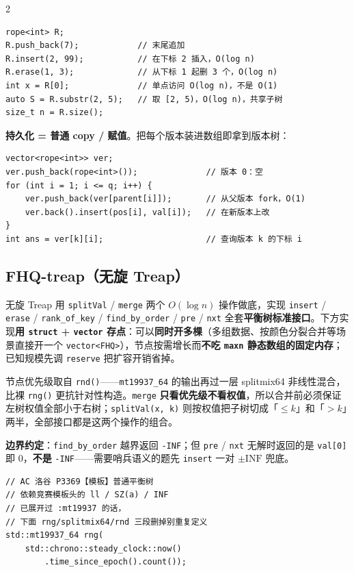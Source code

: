 \begin{multicols*}{2}
\begin{verbatim}
rope<int> R;
R.push_back(7);            // 末尾追加
R.insert(2, 99);           // 在下标 2 插入，O(log n)
R.erase(1, 3);             // 从下标 1 起删 3 个，O(log n)
int x = R[0];              // 单点访问 O(log n)，不是 O(1)
auto S = R.substr(2, 5);   // 取 [2, 5)，O(log n)，共享子树
size_t n = R.size();
	\end{verbatim}

	\textbf{持久化 = 普通 copy / 赋值}。把每个版本装进数组即拿到版本树：

	\begin{verbatim}
vector<rope<int>> ver;
ver.push_back(rope<int>());              // 版本 0：空
for (int i = 1; i <= q; i++) {
    ver.push_back(ver[parent[i]]);       // 从父版本 fork，O(1)
    ver.back().insert(pos[i], val[i]);   // 在新版本上改
}
int ans = ver[k][i];                     // 查询版本 k 的下标 i
	\end{verbatim}

	\subsection{FHQ-treap（无旋 Treap）}

	无旋 Treap 用 \verb|splitVal| / \verb|merge| 两个 $O(\log n)$ 操作做底，实现 \verb|insert| / \verb|erase| / \verb|rank_of_key| / \verb|find_by_order| / \verb|pre| / \verb|nxt| 全套\textbf{平衡树标准接口}。下方实现\textbf{用 \texttt{struct} + \texttt{vector} 存点}：可以\textbf{同时开多棵}（多组数据、按颜色分裂合并等场景直接开一个 \verb|vector<FHQ>|），节点按需增长而\textbf{不吃 \texttt{maxn} 静态数组的固定内存}；已知规模先调 \verb|reserve| 把扩容开销省掉。

	节点优先级取自 \verb|rnd()|——\verb|mt19937_64| 的输出再过一层 splitmix64 非线性混合，比裸 \verb|rng()| 更抗针对性构造。\verb|merge| \textbf{只看优先级不看权值}，所以合并前必须保证左树权值全部小于右树；\verb|splitVal(x, k)| 则按权值把子树切成「$\le k$」和「$> k$」两半，全部接口都是这两个操作的组合。

	\textbf{边界约定}：\verb|find_by_order| 越界返回 \verb|-INF|；但 \verb|pre| / \verb|nxt| 无解时返回的是 \verb|val[0]| 即 $0$，\textbf{不是} \verb|-INF|——需要哨兵语义的题先 \verb|insert| 一对 $\pm\text{INF}$ 兜底。

	\begin{verbatim}
// AC 洛谷 P3369【模板】普通平衡树
// 依赖竞赛模板头的 ll / SZ(a) / INF
// 已展开过 :mt19937 的话，
// 下面 rng/splitmix64/rnd 三段删掉别重复定义
std::mt19937_64 rng(
    std::chrono::steady_clock::now()
        .time_since_epoch().count());


\end{verbatim}
\end{multicols*}
